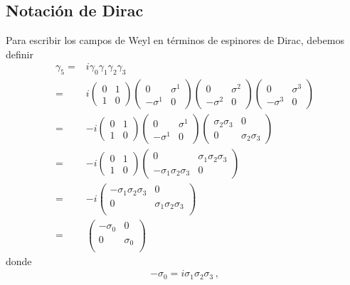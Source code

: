 \subsection{Notación de Dirac}

Para escribir los campos de Weyl en términos de espinores de Dirac, debemos definir
\begin{align}
  \gamma_5=&i\gamma_0\gamma_1\gamma_2\gamma_3 \nonumber\\
=&i
\begin{pmatrix}
0 & 1\\
1 & 0  
\end{pmatrix}
\begin{pmatrix}
0 & \sigma^1\\
-\sigma^1 & 0  
\end{pmatrix}
\begin{pmatrix}
0 & \sigma^2\\
-\sigma^2 & 0  
\end{pmatrix}
\begin{pmatrix}
0 & \sigma^3\\
-\sigma^3 & 0  
\end{pmatrix}\nonumber\\
=&-i\begin{pmatrix}
0 & 1\\
1 & 0  
\end{pmatrix}
\begin{pmatrix}
0 & \sigma^1\\
-\sigma^1 & 0  
\end{pmatrix}
\begin{pmatrix}
\sigma_2\sigma_3 & 0\\
0 & \sigma_2\sigma_3
\end{pmatrix}\nonumber\\
=&-i\begin{pmatrix}
0 & 1\\
1 & 0  
\end{pmatrix}
\begin{pmatrix}
0 & \sigma_1\sigma_2\sigma_3 \\
-\sigma_1\sigma_2\sigma_3 & 0
\end{pmatrix}\nonumber\\
=&-i\begin{pmatrix}
-\sigma_1\sigma_2\sigma_3 & 0 \\
0 &\sigma_1\sigma_2\sigma_3\\
\end{pmatrix}\nonumber\\
=&\begin{pmatrix}
-\sigma_0 & 0 \\
0 &\sigma_0\\
\end{pmatrix}
\end{align}
donde
\begin{align}
  -\sigma_0=i\sigma_1\sigma_2\sigma_3\,,
\end{align}

